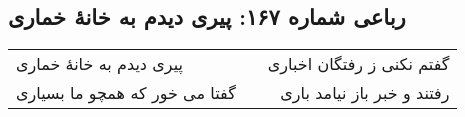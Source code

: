 \begin{center}
\section*{رباعی شماره ۱۶۷: پیری دیدم به خانهٔ خماری}
\label{sec:sh167}
\begin{longtable}{l p{0.5cm} r}
پیری دیدم به خانهٔ خماری
&&
گفتم نکنی ز رفتگان اخباری
\\
گفتا می خور که همچو ما بسیاری
&&
رفتند و خبر باز نیامد باری
\\
\end{longtable}
\end{center}
